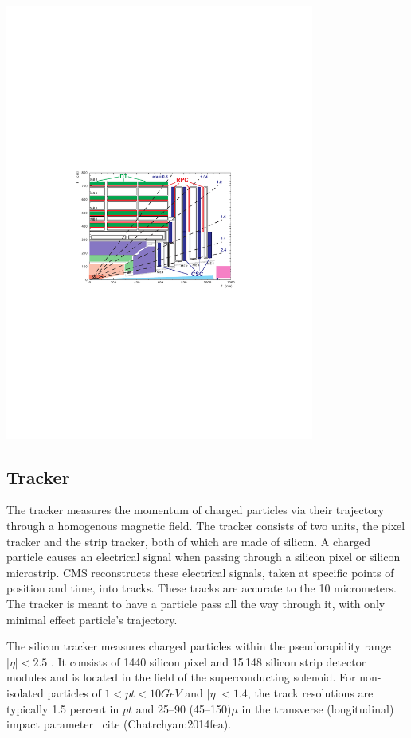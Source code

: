 \centerline{
\includegraphics[width=4in]{Chapter3/importfigs/Figure_001-006.pdf}
}

\subsection{Tracker}

The tracker measures the momentum of charged particles via their trajectory through a homogenous magnetic field. The tracker consists of two units, the pixel tracker and the strip tracker, both of which are made of silicon. A charged particle causes an electrical signal when passing through a silicon pixel or silicon microstrip. CMS reconstructs these electrical signals, taken at specific points of position and time, into tracks. These tracks are accurate to the 10 micrometers. The tracker is meant to have  a particle pass all the way through it, with only minimal effect particle's trajectory.

The silicon tracker measures charged particles within the pseudorapidity range $|\eta| < 2.5$ . It consists of 1440 silicon pixel and 15\,148 silicon strip detector modules and is located in the field of the superconducting solenoid. For non-isolated particles of $1 < pt < 10 GeV$ and $|\eta| < 1.4$, the track resolutions are typically 1.5 percent in $pt$ and 25--90 (45--150)$\mu$ in the transverse (longitudinal) impact parameter~ cite (Chatrchyan:2014fea).

